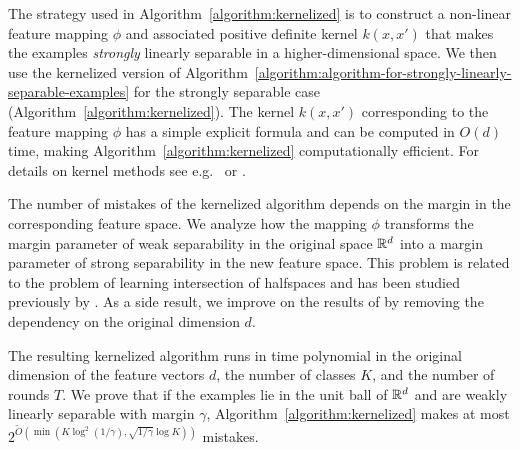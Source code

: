 The strategy used in Algorithm~\ref{algorithm:kernelized} is to construct a
non-linear feature mapping $\phi$ and associated positive definite kernel
$k(x,x')$ that makes the examples \emph{strongly} linearly separable in a higher-dimensional space. 
We then use the kernelized version of
Algorithm~\ref{algorithm:algorithm-for-strongly-linearly-separable-examples} for
the strongly separable case (Algorithm~\ref{algorithm:kernelized}). The kernel
$k(x,x')$ corresponding to the feature mapping $\phi$ has a simple explicit
formula and can be computed in $O(d)$ time, making
Algorithm~\ref{algorithm:kernelized} computationally efficient. For details on
kernel methods see e.g.~\citet{Scholkopf-Smola-2002} or
\citet{Shawe-Taylor-Cristianini-2004}.

The number of mistakes of the kernelized algorithm depends on the margin in the
corresponding feature space. We analyze how the mapping $\phi$ transforms the
margin parameter of weak separability in the original space $\mathbb{R}^d$ into a margin
parameter of strong separability in the new feature space. This problem is
related to the problem of learning intersection of halfspaces and has been
studied previously by \citet{Klivans-Servedio-2008}. As a side result, we
improve on the results of \citet{Klivans-Servedio-2008} by removing the
dependency on the original dimension $d$.

The resulting kernelized algorithm runs in time polynomial in the
original dimension of the feature vectors $d$, the number of classes $K$, and
the number of rounds $T$. We prove that if the examples lie in the unit ball of
$\mathbb{R}^d$ and are weakly linearly separable with margin $\gamma$,
Algorithm~\ref{algorithm:kernelized} makes at
most $2^{\widetilde{O}(\min(K \log^2 (1/\gamma), \sqrt{1/\gamma}
\log K))}$ mistakes.
